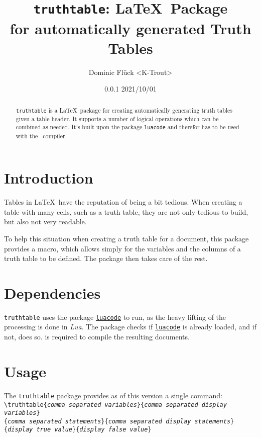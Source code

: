\documentclass[a4paper]{article}
\title{\texttt{truthtable}\textbf{: \LaTeX\ Package\\for automatically generated Truth Tables}}
\author{Dominic Flück <K-Trout>}
\date{0.0.1 2021/10/01}
\begin{document}
	\maketitle

	\begin{abstract}
		\noindent \texttt{truthtable} is a \LaTeX\ package for creating automatically generating truth tables given a table header. It supports a number of logical operations which can be combined as needed. It's built upon the package \href{https://ctan.org/pkg/luacode}{\texttt{luacode}} and therefor has to be used with the \LuaLaTeX\ compiler.
	\end{abstract}

	\tableofcontents

	\section{Introduction}
	Tables in \LaTeX\ have the reputation of being a bit tedious. When creating a table with many cells, such as a truth table, they are not only tedious to build, but also not very readable.

	To help this situation when creating a truth table for a document, this package provides a macro, which allows simply for the variables and the columns of a truth table to be defined. The package then takes care of the rest.

	\section{Dependencies}

	\texttt{truthtable} uses the package \href{https://ctan.org/pkg/luacode}{\texttt{luacode}} to run, as the heavy lifting of the processing is done in \emph{Lua}. 	The package checks if \href{https://ctan.org/pkg/luacode}{\texttt{luacode}} is already loaded, and if not, does so. \LuaLaTeX is required to compile the resulting documents.	

	\section{Usage}

	The \texttt{truthtable} package provides as of this version a single command:\\ \texttt{\textbackslash truthtable\{\emph{comma separated variables}\}\{\emph{comma separated display variables}\}\\\{\emph{comma separated statements}\}\{\emph{comma separated display statements}\}\\\{\emph{display true value}\}\{\emph{display false value}\}}
\end{document}
